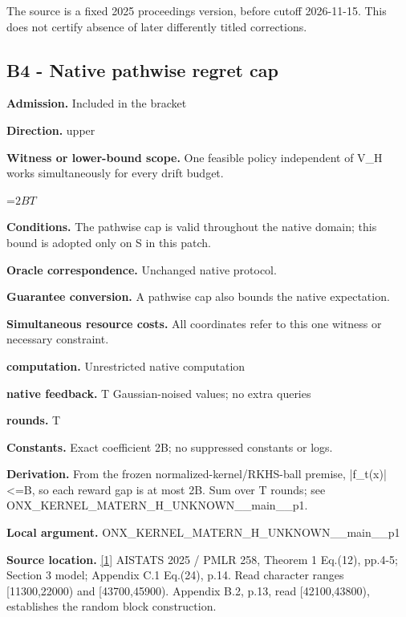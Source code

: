\documentclass[10pt,a4paper]{article}
\newcommand{\AtlasMath}[1]{\par\begingroup\centering\setbox0=\hbox{$\displaystyle #1$}\ifdim\wd0>1.4\linewidth\typeout{ATLAS WIDE FORMULA: \the\wd0}\fi\ifdim\wd0>\linewidth\resizebox{\linewidth}{!}{\box0}\else\box0\fi\par\endgroup}
\begin{document}
The source is a fixed 2025 proceedings version, before cutoff 2026-11-15. This does not certify absence of later differently titled corrections.

\subsection{B4 - Native pathwise regret cap}
\textbf{Admission.} Included in the bracket

\textbf{Direction.} upper

\textbf{Witness or lower-bound scope.} One feasible policy independent of V\_\allowbreak{}H works simultaneously for every drift budget.

\AtlasMath{2BT}
\textbf{Conditions.} The pathwise cap is valid throughout the native domain; this bound is adopted only on S in this patch.

\textbf{Oracle correspondence.} Unchanged native protocol.

\textbf{Guarantee conversion.} A pathwise cap also bounds the native expectation.

\textbf{Simultaneous resource costs.} All coordinates refer to this one witness or necessary constraint.

\textbf{computation.} Unrestricted native computation

\textbf{native feedback.} T Gaussian-noised values; no extra queries

\textbf{rounds.} T

\textbf{Constants.} Exact coefficient 2B; no suppressed constants or logs.

\textbf{Derivation.} From the frozen normalized-kernel/RKHS-ball premise, |f\_\allowbreak{}t(x)|<=B, so each reward gap is at most 2B. Sum over T rounds; see ONX\_\allowbreak{}KERNEL\_\allowbreak{}MATERN\_\allowbreak{}H\_\allowbreak{}UNKNOWN\_\allowbreak{}\_\allowbreak{}main\_\allowbreak{}\_\allowbreak{}p1.

\textbf{Local argument.} ONX\_\allowbreak{}KERNEL\_\allowbreak{}MATERN\_\allowbreak{}H\_\allowbreak{}UNKNOWN\_\allowbreak{}\_\allowbreak{}main\_\allowbreak{}\_\allowbreak{}p1

\textbf{Source location.} \href{https://raw.githubusercontent.com/mlresearch/v258/main/assets/cai25a/cai25a.pdf}{[1]} AISTATS 2025 / PMLR 258, Theorem 1 Eq.(12), pp.4-5; Section 3 model; Appendix C.1 Eq.(24), p.14. Read character ranges [11300,22000) and [43700,45900). Appendix B.2, p.13, read [42100,43800), establishes the random block construction.
\end{document}
